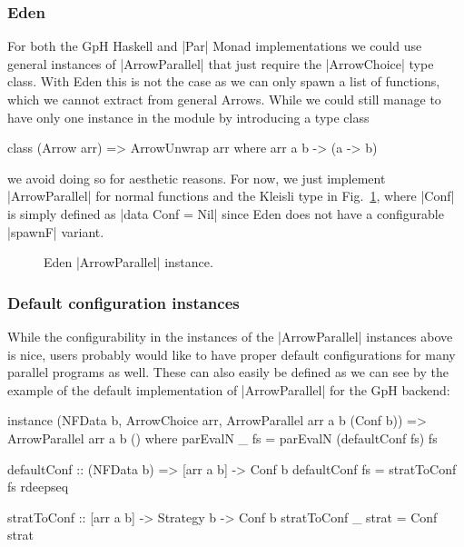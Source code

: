 \subsubsection{Eden}
For both the GpH Haskell and |Par| Monad implementations we could use general instances of |ArrowParallel| that just require the |ArrowChoice| type class. With Eden this is not the case as we can only spawn a list of functions, which we cannot extract from general Arrows. While we could still manage to have only one instance in the module by introducing a type class %
\begin{code}
class (Arrow arr) => ArrowUnwrap arr where
	arr a b -> (a -> b)
\end{code}
we avoid doing so for aesthetic reasons. For now, we just implement |ArrowParallel| for normal functions and the Kleisli type in Fig.~\ref{fig:ArrowParallelEden}, where |Conf| is simply defined as |data Conf = Nil| since Eden does not have a configurable |spawnF| variant. %
\begin{figure}[t]
\caption{Eden |ArrowParallel| instance.}
\label{fig:ArrowParallelEden}
\end{figure}

\subsubsection{Default configuration instances}
While the configurability in the instances of the |ArrowParallel| instances above is nice, users probably would like to have proper default configurations for many parallel programs as well. These can also easily be defined as we can see by the example of the default implementation of |ArrowParallel| for the GpH backend:

\begin{code}
instance (NFData b, ArrowChoice arr, ArrowParallel arr a b (Conf b)) =>
  ArrowParallel arr a b () where
    parEvalN _ fs = parEvalN (defaultConf fs) fs

defaultConf :: (NFData b) => [arr a b] -> Conf b
defaultConf fs = stratToConf fs rdeepseq

stratToConf :: [arr a b] -> Strategy b -> Conf b
stratToConf _ strat = Conf strat
\end{code}

